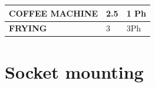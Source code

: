 \documentclass[12pt,fleqn]{book} %
\begin{document}
\begin{table}[h!]
\begin{tabular}{!{\color[rgb]{0.557,0.667,0.859}\vrule}l!{\color{black}\vrule}l!{\color[rgb]{0.557,0.667,0.859}\vrule}l!{\color[rgb]{0.557,0.667,0.859}\vrule}}
\hline
\textbf{COFFEE MACHINE}                                                                                         & 2.5                                                & 1 Ph                                                                                          \\ 
\hline
{} \textbf{FRYING}                                                               & 3                                                  & 3Ph                                                                                           \\
\hline
\end{tabular}
\end{table}

\section{Socket mounting}
\end{document}
